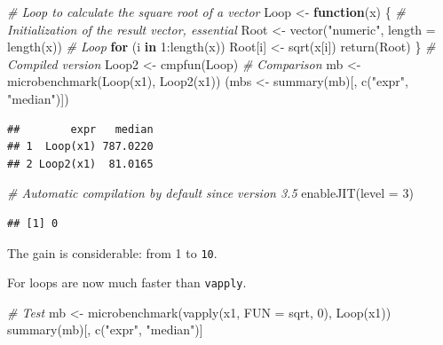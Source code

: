 \documentclass[
  12pt,
  american,
  a4paper,
  extrafontsizes,onecolumn,openright
  ]{memoir}
\newenvironment{Shaded}{\begin{snugshade}}{\end{snugshade}}
\newcommand{\AttributeTok}[1]{\textcolor[rgb]{0.77,0.63,0.00}{#1}}
\newcommand{\CommentTok}[1]{\textcolor[rgb]{0.56,0.35,0.01}{\textit{#1}}}
\newcommand{\ControlFlowTok}[1]{\textcolor[rgb]{0.13,0.29,0.53}{\textbf{#1}}}
\newcommand{\DecValTok}[1]{\textcolor[rgb]{0.00,0.00,0.81}{#1}}
\newcommand{\FunctionTok}[1]{\textcolor[rgb]{0.00,0.00,0.00}{#1}}
\newcommand{\NormalTok}[1]{#1}
\newcommand{\OtherTok}[1]{\textcolor[rgb]{0.56,0.35,0.01}{#1}}
\newcommand{\SpecialCharTok}[1]{\textcolor[rgb]{0.00,0.00,0.00}{#1}}
\newcommand{\StringTok}[1]{\textcolor[rgb]{0.31,0.60,0.02}{#1}}
\begin{document}
\begin{Shaded}
\begin{Highlighting}[]
\CommentTok{\# Loop to calculate the square root of a vector}
\NormalTok{Loop }\OtherTok{\textless{}{-}} \ControlFlowTok{function}\NormalTok{(x) \{}
    \CommentTok{\# Initialization of the result vector, essential}
\NormalTok{    Root }\OtherTok{\textless{}{-}} \FunctionTok{vector}\NormalTok{(}\StringTok{"numeric"}\NormalTok{, }\AttributeTok{length =} \FunctionTok{length}\NormalTok{(x))}
    \CommentTok{\# Loop}
    \ControlFlowTok{for}\NormalTok{ (i }\ControlFlowTok{in} \DecValTok{1}\SpecialCharTok{:}\FunctionTok{length}\NormalTok{(x)) Root[i] }\OtherTok{\textless{}{-}} \FunctionTok{sqrt}\NormalTok{(x[i])}
    \FunctionTok{return}\NormalTok{(Root)}
\NormalTok{\}}
\CommentTok{\# Compiled version}
\NormalTok{Loop2 }\OtherTok{\textless{}{-}} \FunctionTok{cmpfun}\NormalTok{(Loop)}
\CommentTok{\# Comparison}
\NormalTok{mb }\OtherTok{\textless{}{-}} \FunctionTok{microbenchmark}\NormalTok{(}\FunctionTok{Loop}\NormalTok{(x1), }\FunctionTok{Loop2}\NormalTok{(x1))}
\NormalTok{(mbs }\OtherTok{\textless{}{-}} \FunctionTok{summary}\NormalTok{(mb)[, }\FunctionTok{c}\NormalTok{(}\StringTok{"expr"}\NormalTok{, }\StringTok{"median"}\NormalTok{)])}
\end{Highlighting}
\end{Shaded}

\begin{verbatim}
##        expr   median
## 1  Loop(x1) 787.0220
## 2 Loop2(x1)  81.0165
\end{verbatim}

\begin{Shaded}
\begin{Highlighting}[]
\CommentTok{\# Automatic compilation by default since version 3.5}
\FunctionTok{enableJIT}\NormalTok{(}\AttributeTok{level =} \DecValTok{3}\NormalTok{)}
\end{Highlighting}
\end{Shaded}

\begin{verbatim}
## [1] 0
\end{verbatim}

\normalsize

The gain is considerable: from 1 to \texttt{10}.

For loops are now much faster than \texttt{vapply}.

\scriptsize

\begin{Shaded}
\begin{Highlighting}[]
\CommentTok{\# Test}
\NormalTok{mb }\OtherTok{\textless{}{-}} \FunctionTok{microbenchmark}\NormalTok{(}\FunctionTok{vapply}\NormalTok{(x1, }\AttributeTok{FUN =}\NormalTok{ sqrt, }\DecValTok{0}\NormalTok{), }\FunctionTok{Loop}\NormalTok{(x1))}
\FunctionTok{summary}\NormalTok{(mb)[, }\FunctionTok{c}\NormalTok{(}\StringTok{"expr"}\NormalTok{, }\StringTok{"median"}\NormalTok{)]}
\end{Highlighting}
\end{Shaded}
\end{document}
